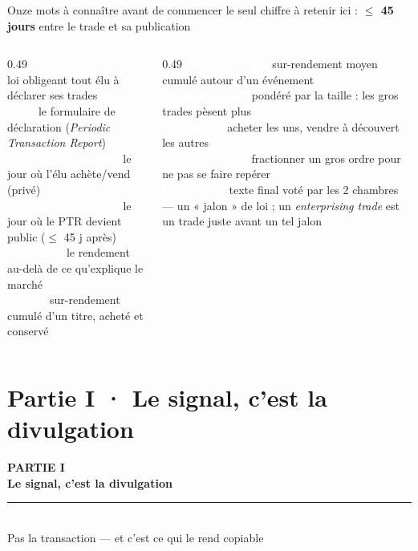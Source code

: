 \documentclass[11pt,aspectratio=169]{beamer}
\newcommand{\badge}[2]{\colorbox{#1}{\textcolor{white}{\footnotesize\textbf{#2}}}}
\begin{document}
\begin{frame}{Onze mots à connaître avant de commencer}
  \centering
  {\footnotesize le seul chiffre à retenir ici : \textbf{$\leq$ 45 jours} entre le trade et sa publication}\\[2.5mm]
  \begin{columns}[T]
    \begin{column}{0.49\textwidth}
      {\scriptsize
      \badge{helec}{STOCK Act (2012)} loi obligeant tout élu à déclarer ses trades\\[1.4mm]
      \badge{helec}{PTR} le formulaire de déclaration (\emph{Periodic Transaction Report})\\[1.4mm]
      \badge{grisC}{Date de transaction} le jour où l'élu achète/vend (privé)\\[1.4mm]
      \badge{helec}{Date de divulgation} le jour où le PTR devient public ($\leq$ 45 j après)\\[1.4mm]
      \badge{okgreen}{Alpha ($\alpha$)} le rendement au-delà de ce qu'explique le marché\\[1.4mm]
      \badge{okgreen}{BHAR} sur-rendement cumulé d'un titre, acheté et conservé
      }
    \end{column}
    \begin{column}{0.49\textwidth}
      {\scriptsize
      \badge{okgreen}{CAAR / CAR} sur-rendement moyen cumulé autour d'un événement\\[1.4mm]
      \badge{grisC}{Value-weighted} pondéré par la taille : les gros trades pèsent plus\\[1.4mm]
      \badge{grisC}{Long-short} acheter les uns, vendre à découvert les autres\\[1.4mm]
      \badge{warnorange}{Stealth trading} fractionner un gros ordre pour ne pas se faire repérer\\[1.4mm]
      \badge{warnorange}{Enrollment} texte final voté par les 2 chambres --- un « jalon » de loi ; un \emph{enterprising trade} est un trade juste avant un tel jalon
      }
    \end{column}
  \end{columns}
\end{frame}

\section{Partie I · Le signal, c'est la divulgation}

\begin{frame}[plain]
  \centering
  \vspace{12mm}
  {\color{helec!85}\large\textbf{PARTIE I}}\\[3mm]
  {\color{black!88}\fontsize{30}{34}\selectfont\textbf{Le signal, c'est la divulgation}}\\[3mm]
  {\color{helec!45}\rule{0.30\textwidth}{1.2pt}}\\[3mm]
  {\color{black!55}\large Pas la transaction --- et c'est ce qui le rend copiable}
\end{frame}
\end{document}
